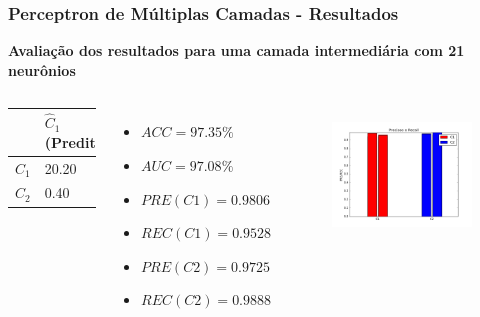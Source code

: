 \documentclass{beamer}
\begin{document}
\begin{frame}
\frametitle{Perceptron de Múltiplas Camadas - Resultados}
\textbf{Avaliação dos resultados para uma camada intermediária com 21 neurônios}
\begin{columns}[c] 
\begin{table}
\begin{tabular}{l l l}
\toprule
 & \textbf{$\hat{C}_1$ (Predita)} & \textbf{$\hat{C}_2$(Predita)}\\
\midrule
$C_1$ & 20.20&1.00\\
$C_2$ & 0.40&35.30\\ 
\bottomrule
\end{tabular}
\begin{itemize}
\item $ACC = 97.35 \%$
\item $AUC = 97.08 \%$
\item $PRE(C1) = 0.9806$
\item $REC(C1) = 0.9528$
\item $PRE(C2) = 0.9725$
\item $REC(C2) = 0.9888$
\end{itemize}
\end{table}

\begin{figure}[H]
\centering
  \includegraphics[width=\linewidth]{../img/mlp_rec.png}
  \label{fig:percep}
\end{figure}%

\end{columns}
\end{frame}
\end{document}
